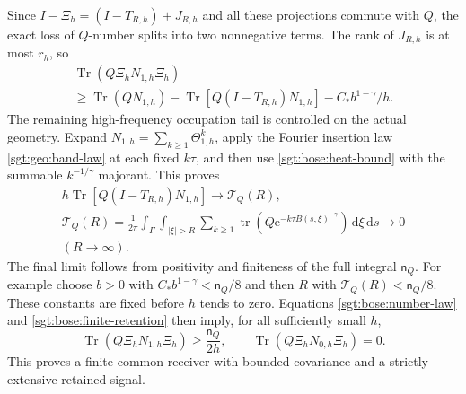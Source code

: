 \documentclass[aps,pra,reprint,superscriptaddress,longbibliography]{revtex4-2}
\newcommand{\Tr}{\operatorname{Tr}}
\newcommand{\dd}{\mathrm d}
\newcommand{\ee}{\mathrm e}
\begin{document}
Since $I-\Xi_h=(I-T_{R,h})+J_{R,h}$ and all these projections commute
with $Q$, the exact loss of $Q$-number splits into two nonnegative
terms.  The rank of $J_{R,h}$ is at most $r_h$, so
\begin{equation}
\begin{gathered}
 \Tr(Q\Xi_hN_{1,h}\Xi_h)
\\
  \ge\Tr(QN_{1,h})-\Tr[Q(I-T_{R,h})N_{1,h}]
                         -C_*b^{1-\gamma}/h.
 \label{sgt:bose:finite-retention}
\end{gathered}
\end{equation}
The remaining high-frequency occupation tail is controlled on the
actual geometry.  Expand $N_{1,h}=\sum_{k\ge1}\Theta_{1,h}^k$, apply
the Fourier insertion law \eqref{sgt:geo:band-law} at each fixed
$k\tau$, and then use \eqref{sgt:bose:heat-bound} with the summable
$k^{-1/\gamma}$ majorant.  This proves
\begin{gather}
 h\Tr[Q(I-T_{R,h})N_{1,h}]\longrightarrow\mathcal T_Q(R),\nonumber\\
 \mathcal T_Q(R)
 =\frac1{2\pi}\int_\Gamma\int_{|\xi|>R}
    \sum_{k\ge1}\operatorname{tr}
        (Q\ee^{-k\tau B(s,\xi)^{-\gamma}})
                                      \,\dd\xi\,\dd s
   \longrightarrow0\\
(R\to\infty).
 \label{sgt:bose:fourier-number-tail}
\end{gather}
The final limit follows from positivity and finiteness of the full
integral $\mathsf n_Q$.  For example choose $b>0$ with
$C_*b^{1-\gamma}<\mathsf n_Q/8$ and then $R$ with
$\mathcal T_Q(R)<\mathsf n_Q/8$.  These constants are fixed before $h$ tends
to zero.  Equations \eqref{sgt:bose:number-law} and
\eqref{sgt:bose:finite-retention} then imply, for all sufficiently
small $h$,
\begin{equation}
 \Tr(Q\Xi_hN_{1,h}\Xi_h)\ge\frac{\mathsf n_Q}{2h},
 \qquad\Tr(Q\Xi_hN_{0,h}\Xi_h)=0.
 \label{sgt:bose:retained-gap}
\end{equation}
This proves a finite common receiver with bounded covariance and a
strictly extensive retained signal.
\end{document}
